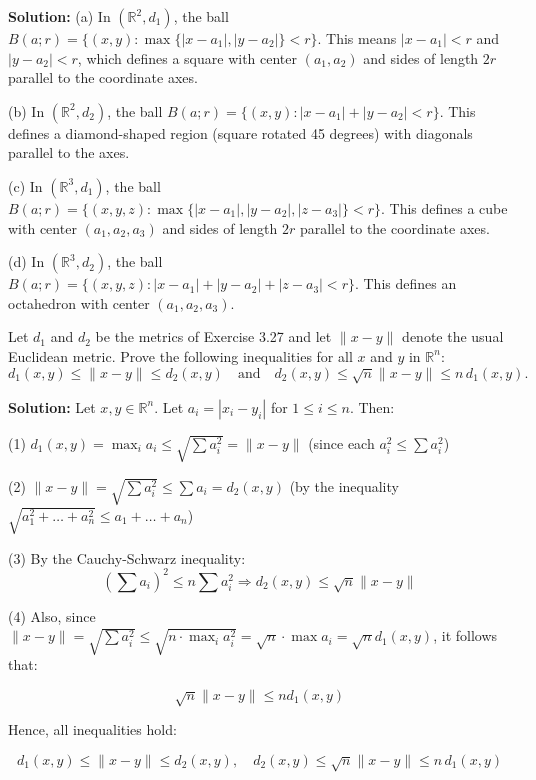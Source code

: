 \textbf{Solution:} 
(a) In $(\mathbb{R}^2, d_1)$, the ball $B(a;r) = \{(x,y) : \max\{|x-a_1|, |y-a_2|\} < r\}$. This means $|x-a_1| < r$ and $|y-a_2| < r$, which defines a square with center $(a_1,a_2)$ and sides of length $2r$ parallel to the coordinate axes.

(b) In $(\mathbb{R}^2, d_2)$, the ball $B(a;r) = \{(x,y) : |x-a_1| + |y-a_2| < r\}$. This defines a diamond-shaped region (square rotated 45 degrees) with diagonals parallel to the axes.

(c) In $(\mathbb{R}^3, d_1)$, the ball $B(a;r) = \{(x,y,z) : \max\{|x-a_1|, |y-a_2|, |z-a_3|\} < r\}$. This defines a cube with center $(a_1,a_2,a_3)$ and sides of length $2r$ parallel to the coordinate axes.

(d) In $(\mathbb{R}^3, d_2)$, the ball $B(a;r) = \{(x,y,z) : |x-a_1| + |y-a_2| + |z-a_3| < r\}$. This defines an octahedron with center $(a_1,a_2,a_3)$.

\begin{problembox}
Let \( d_1 \) and \( d_2 \) be the metrics of Exercise 3.27 and let \( \|x - y\| \) denote the usual Euclidean metric. Prove the following inequalities for all \( x \) and \( y \) in \( \mathbb{R}^n \):
\[d_1(x, y) \leq \|x - y\| \leq d_2(x, y) \quad \text{and} \quad d_2(x, y) \leq \sqrt{n} \|x - y\| \leq n\,d_1(x, y).\]
\end{problembox}

\textbf{Solution:} Let $x, y \in \mathbb{R}^n$. Let $a_i = |x_i - y_i|$ for $1 \leq i \leq n$. Then:

(1) \( d_1(x, y) = \max_i a_i \leq \sqrt{\sum a_i^2} = \|x - y\| \) (since each $a_i^2 \leq \sum a_i^2$)

(2) \( \|x - y\| = \sqrt{\sum a_i^2} \leq \sum a_i = d_2(x,y) \) (by the inequality \( \sqrt{a_1^2 + \dots + a_n^2} \leq a_1 + \dots + a_n \))

(3) By the Cauchy-Schwarz inequality:
\[
\left(\sum a_i\right)^2 \leq n \sum a_i^2 \Rightarrow d_2(x,y) \leq \sqrt{n} \|x - y\|
\]

(4) Also, since \( \|x - y\| = \sqrt{\sum a_i^2} \leq \sqrt{n \cdot \max_i a_i^2} = \sqrt{n} \cdot \max a_i = \sqrt{n} d_1(x, y) \), it follows that:

\[
\sqrt{n} \|x - y\| \leq n d_1(x, y)
\]

Hence, all inequalities hold:

\[
d_1(x,y) \leq \|x - y\| \leq d_2(x,y), \quad d_2(x, y) \leq \sqrt{n} \|x - y\| \leq n\,d_1(x, y)
\]


